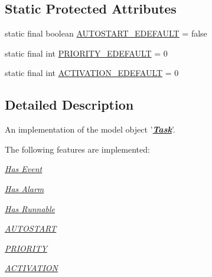 \subsection*{Static Protected Attributes}
\begin{DoxyCompactItemize}
\item 
static final boolean \hyperlink{classshootingmachineemfmodel_1_1impl_1_1_task_impl_a70eecc221cc934d53c7dd6695a9803fe}{A\-U\-T\-O\-S\-T\-A\-R\-T\-\_\-\-E\-D\-E\-F\-A\-U\-L\-T} = false
\item 
static final int \hyperlink{classshootingmachineemfmodel_1_1impl_1_1_task_impl_af278a531c9292c228130ebdf1638301a}{P\-R\-I\-O\-R\-I\-T\-Y\-\_\-\-E\-D\-E\-F\-A\-U\-L\-T} = 0
\item 
static final int \hyperlink{classshootingmachineemfmodel_1_1impl_1_1_task_impl_a1091e4f368608ccd335964978b9ba4dc}{A\-C\-T\-I\-V\-A\-T\-I\-O\-N\-\_\-\-E\-D\-E\-F\-A\-U\-L\-T} = 0
\end{DoxyCompactItemize}


\subsection{Detailed Description}
An implementation of the model object '{\itshape {\bfseries \hyperlink{interfaceshootingmachineemfmodel_1_1_task}{Task}}}'.

The following features are implemented\-: 
\begin{DoxyItemize}
\item \hyperlink{classshootingmachineemfmodel_1_1impl_1_1_task_impl_a7a7f8af008aa5bb195e34d29cfb0f982}{{\itshape Has Event}} 
\item \hyperlink{classshootingmachineemfmodel_1_1impl_1_1_task_impl_a89dcca06c6b9120c2836ee850bd18073}{{\itshape Has Alarm}} 
\item \hyperlink{classshootingmachineemfmodel_1_1impl_1_1_task_impl_a0d2049f4d0efcb7d3dea6f88429a3674}{{\itshape Has Runnable}} 
\item \hyperlink{classshootingmachineemfmodel_1_1impl_1_1_task_impl_a21a04300417c61203bfbaa4750b93d0b}{{\itshape A\-U\-T\-O\-S\-T\-A\-R\-T}} 
\item \hyperlink{classshootingmachineemfmodel_1_1impl_1_1_task_impl_afbc32e6264af20e59fee3c02b3a192fb}{{\itshape P\-R\-I\-O\-R\-I\-T\-Y}} 
\item \hyperlink{classshootingmachineemfmodel_1_1impl_1_1_task_impl_a7d652c92762b3e960b4fc28dacd002d0}{{\itshape A\-C\-T\-I\-V\-A\-T\-I\-O\-N}} 
\end{DoxyItemize}

